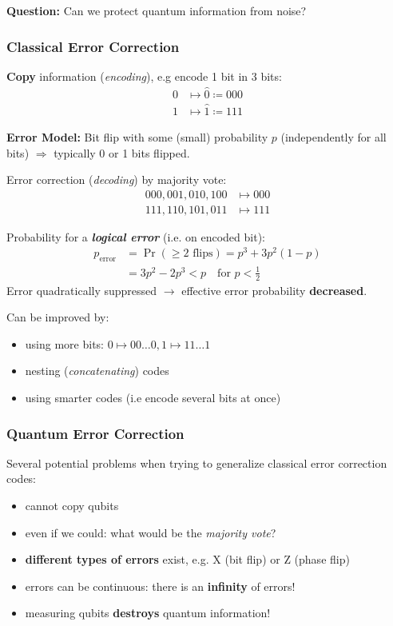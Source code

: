 \documentclass[a4paper, 12pt]{article}
\theoremstyle{plain}
\theoremstyle{definition}
\theoremstyle{remark}
\begin{document}
\textbf{Question:} Can we protect quantum information from noise?
\subsubsection*{Classical Error Correction}
\textbf{Copy} information (\emph{encoding}), e.g encode 1 bit in 3 bits:
\begin{align*}
  0 &\mapsto \hat{0} \coloneqq 000 \\
  1 &\mapsto \hat{1} \coloneqq 111
\end{align*}

\textbf{Error Model:} Bit flip with some (small) probability $p$ (independently for all bits) $\Longrightarrow$ typically 0 or 1 bits flipped.

Error correction (\emph{decoding}) by majority vote:
\begin{align*}
  000, 001, 010, 100 &\mapsto 000 \\
  111, 110, 101, 011 &\mapsto 111
\end{align*}

Probability for a \emph{\textbf{logical error}} (i.e. on encoded bit):
\begin{align*}
  p_{\text{error}} &= \Pr(\geq 2 \text{ flips}) = p^3 + 3p^2(1-p) \\
  &= 3p^2 - 2p^3 < p \quad \text{for } p < \frac{1}{2}
\end{align*}
Error quadratically suppressed $\rightarrow$ effective error probability \textbf{decreased}.

Can be improved by:
\begin{itemize}
  \item using more bits: $0 \mapsto 00\ldots0, 1 \mapsto 11\ldots1$
  \item nesting (\emph{concatenating}) codes
  \item using smarter codes (i.e encode several bits at once)
\end{itemize}
\subsubsection*{Quantum Error Correction}
Several potential problems when trying to generalize classical error correction codes:
\begin{itemize}
  \item cannot copy qubits
  \item even if we could: what would be the \emph{majority vote}?
  \item \textbf{different types of errors} exist, e.g. X (bit flip) or Z (phase flip)
  \item errors can be continuous: there is an \textbf{infinity} of errors!
  \item measuring qubits \textbf{destroys} quantum information!
\end{itemize}
\end{document}
